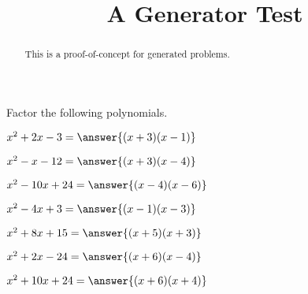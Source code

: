\documentclass{ximera}
\begin{document}
\title{A Generator Test}
\begin{abstract}
This is a proof-of-concept for generated problems.
\end{abstract}
\maketitle

Factor the following polynomials.

  \begin{question}
  $x^2 + 2x - 3 = \answer{(x + 3)(x - 1)}$
  \end{question}
  \begin{question}
  $x^2 - x - 12 = \answer{(x + 3)(x - 4)}$
  \end{question}
  \begin{question}
  $x^2 - 10x + 24 = \answer{(x - 4)(x - 6)}$
  \end{question}
  \begin{question}
  $x^2 - 4x + 3 = \answer{(x - 1)(x - 3)}$
  \end{question}
  \begin{question}
  $x^2 + 8x + 15 = \answer{(x + 5)(x + 3)}$
  \end{question}
  \begin{question}
  $x^2 + 2x - 24 = \answer{(x + 6)(x - 4)}$
  \end{question}
  \begin{question}
  $x^2 + 10x + 24 = \answer{(x + 6)(x + 4)}$
  \end{question}
\end{document}
